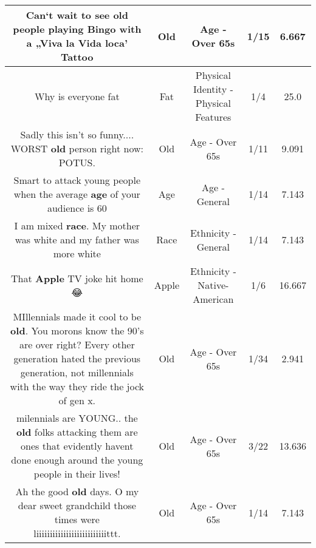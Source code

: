 \documentclass[11pt]{article}
\newlength\mylength
\begin{document}
\begin{center}
\begin{longtable}{|C{.65\mylength}|C{.30\mylength}|C{.12\mylength}|C{.12\mylength}|C{.12\mylength}|}
  \small Can‘t wait to see \textbf{old} people playing Bingo with a „Viva la Vida loca' Tattoo\normalsize   & Old & Age - Over 65s & 1/15 & 6.667 \\  \hline
  \small Why is everyone fat\normalsize   & Fat & Physical Identity - Physical Features & 1/4 & 25.0 \\  \hline
  \small Sadly this isn't so funny.... WORST \textbf{old} person right now: POTUS.\normalsize   & Old & Age - Over 65s & 1/11 & 9.091 \\  \hline
  \small Smart to attack young people when the average \textbf{age} of your audience is 60\normalsize   & Age & Age - General & 1/14 & 7.143 \\  \hline
  \small I am mixed \textbf{race}.  My mother was white and my father was more white\normalsize   & Race & Ethnicity - General & 1/14 & 7.143 \\  \hline
  \small That \textbf{Apple} TV joke hit home😂\normalsize   & Apple & Ethnicity - Native-American & 1/6 & 16.667 \\  \hline
  \small MIllennials made it cool to be \textbf{old}. You morons know the 90's are over right? Every other generation hated the previous generation, not millennials with the way they ride the jock of gen x.\normalsize   & Old & Age - Over 65s & 1/34 & 2.941 \\  \hline
  \small milennials are YOUNG.. the \textbf{old} folks attacking them are ones that evidently havent done enough around the young people in their lives!\normalsize   & Old & Age - Over 65s & 3/22 & 13.636 \\  \hline
  \small Ah the good \textbf{old} days. O my dear sweet grandchild those times were liiiiiiiiiiiiiiiiiiiiiiiiiittt.\normalsize   & Old & Age - Over 65s & 1/14 & 7.143 \\  \hline

\end{longtable}
\end{center}
\end{document}
